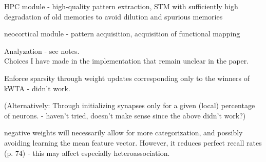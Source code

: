 HPC module - high-quality pattern extraction, STM with sufficiently high degradation of old memories to avoid dilution and spurious memories

neocortical module - pattern acquisition, acquisition of functional mapping

Analyzation - see notes.
\\

Choices I have made in the implementation that remain unclear in the paper.

Enforce sparsity through weight updates corresponding only to the winners of kWTA - didn't work.

(Alternatively: Through initializing synapses only for a given (local) percentage of neurons. - haven't tried, doesn't make sense since the above didn't work?)

negative weights will necessarily allow for more categorization, and possibly avoiding learning the mean feature vector. However, it reduces perfect recall rates (p. 74) - this may affect especially heteroassociation.
